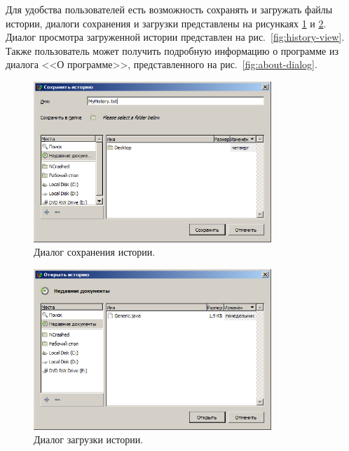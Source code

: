 \documentclass[russian,utf8,simple,emptystyle]{eskdtext}
\begin{document}
Для удобства пользователей есть возможность сохранять и загружать файлы истории, диалоги сохранения и загрузки представлены на рисункаях \ref{fig:history-save} и \ref{fig:history-load}. Диалог просмотра загруженной истории представлен на рис.~\ref{fig:history-view}. Также пользователь может получить подробную информацию о программе из диалога <<О программе>>, представленного на рис.~\ref{fig:about-dialog}.

\begin{figure}[!h]
\centering
\includegraphics[width=0.8\textwidth]{history_save}
\caption{Диалог сохранения истории.}
\label{fig:history-save}
\end{figure}

\begin{figure}[!h]
\centering
\includegraphics[width=0.8\textwidth]{history_load}
\caption{Диалог загрузки истории.}
\label{fig:history-load}
\end{figure}
\end{document}
